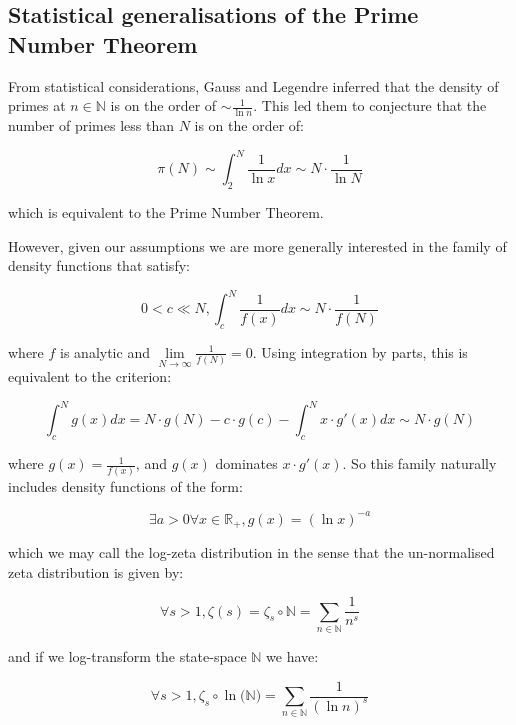 \documentclass{article}
\begin{document}
\subsection{Statistical generalisations of the Prime Number Theorem}

From statistical considerations, Gauss and Legendre inferred that the density of primes at $n \in \mathbb{N}$ is on the order of $\sim \frac{1}{\ln n}$. This led them to conjecture that the number of primes less than $N$ is on the order of:

\begin{equation}
\pi(N) \sim \int_{2}^N \frac{1}{\ln x} dx \sim N \cdot \frac{1}{\ln N}
\end{equation}

which is equivalent to the Prime Number Theorem.

However, given our assumptions we are more generally interested in the family of density functions that satisfy:  

\begin{equation}
0 < c \ll N, \int_{c}^N \frac{1}{f(x)} dx \sim N \cdot \frac{1}{f(N)}
\end{equation}

where $f$ is analytic and $\lim\limits_{N \to \infty} \frac{1}{f(N)}=0$. Using integration by parts, this is equivalent to the criterion:

\begin{equation}
\int_{c}^N g(x) dx = N \cdot g(N) - c \cdot g(c) - \int_{c}^N x \cdot g'(x) dx \sim N \cdot g(N)
\end{equation}

where $g(x)=\frac{1}{f(x)}$, and $g(x)$ dominates $x \cdot g'(x)$.
So this family naturally includes density functions of the form:

\begin{equation}
\exists a > 0 \forall x \in \mathbb{R}_+, g(x) = (\ln x)^{-a}
\end{equation}

which we may call the log-zeta distribution in the sense that the un-normalised zeta distribution
is given by:

\begin{equation}
\forall s >1, \zeta(s) = \zeta_s \circ \mathbb{N} = \sum_{n \in \mathbb{N}} \frac{1}{n^s}
\end{equation}

and if we log-transform the state-space $\mathbb{N}$ we have:

\begin{equation}
\forall s >1, \zeta_s \circ \ln \big(\mathbb{N}\big) = \sum_{n \in \mathbb{N}} \frac{1}{(\ln n)^s}
\end{equation}
\end{document}
